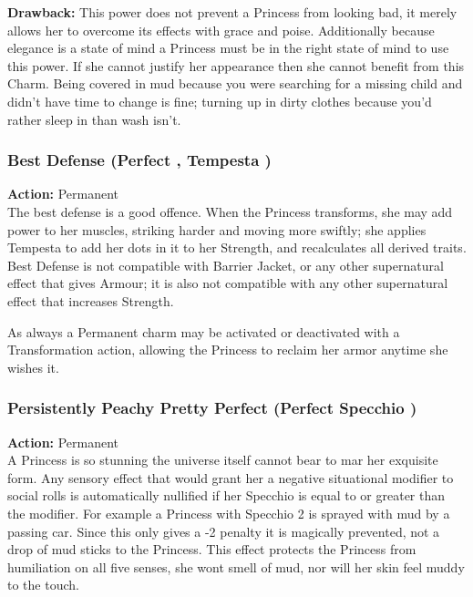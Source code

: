 \textbf{Drawback:} This power does not prevent a Princess from looking bad, it merely allows her to overcome its effects with grace and poise. Additionally because elegance is a state of mind a Princess must be in the right state of mind to use this power. If she cannot justify her appearance then she cannot benefit from this Charm. Being covered in mud because you were searching for a missing child and didn't have time to change is fine; turning up in dirty clothes because you'd rather sleep in than wash isn't.

\subsubsection*{Best Defense (Perfect \textbullet\textbullet, Tempesta \textbullet)}

\noindent \textbf{Action:} Permanent \\

\noindent The best defense is a good offence. When the Princess transforms, she may add power to her muscles, striking harder and moving more swiftly; she applies Tempesta to add her dots in it to her Strength, and recalculates all derived traits. Best Defense is not compatible with Barrier Jacket, or any other supernatural effect that gives Armour; it is also not compatible with any other supernatural effect that increases Strength.

As always a Permanent charm may be activated or deactivated with a Transformation action, allowing the Princess to reclaim her armor anytime she wishes it. 

\subsubsection*{Persistently Peachy Pretty Perfect (Perfect \textbullet\textbullet Specchio \textbullet)}

\noindent \textbf{Action:} Permanent \\

\noindent A Princess is so stunning the universe itself cannot bear to mar her exquisite form. Any sensory effect that would grant her a negative situational modifier to social rolls is automatically nullified if her Specchio is equal to or greater than the modifier. For example a Princess with Specchio 2 is sprayed with mud by a passing car. Since this only gives a -2 penalty it is magically prevented, not a drop of mud sticks to the Princess. This effect protects the Princess from humiliation on all five senses, she wont smell of mud, nor will her skin feel muddy to the touch.


